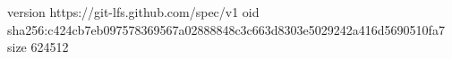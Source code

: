 version https://git-lfs.github.com/spec/v1
oid sha256:c424cb7eb097578369567a02888848c3c663d8303e5029242a416d5690510fa7
size 624512
